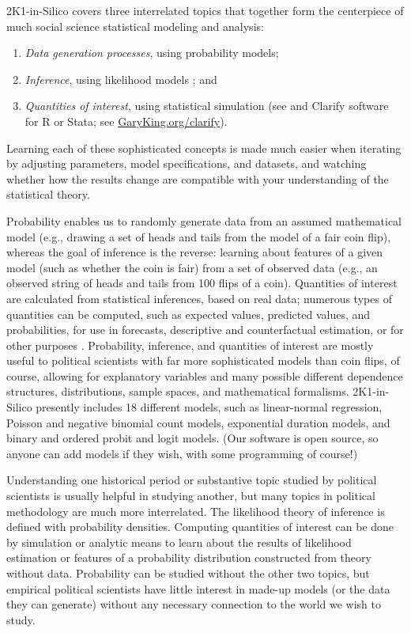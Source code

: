 \documentclass[12pt]{article}
\theoremstyle{definition}
\begin{document}
2K1-in-Silico covers three interrelated topics that together form the centerpiece of much social science statistical modeling and analysis:
\begin{enumerate}\singlespacing
  \item \emph{Data generation processes}, using probability models;
  \item \emph{Inference}, using likelihood models \citep{King98}; and
  \item \emph{Quantities of interest}, using statistical simulation (see \citealt{KinTomWit00} and Clarify software for R or Stata; see \href{https://GaryKing.org/clarify}{GaryKing.org/clarify}).
  \end{enumerate}
Learning each of these sophisticated concepts is made much easier when iterating by adjusting parameters, model specifications, and datasets, and watching whether how the results change are compatible with your understanding of the statistical theory.

Probability enables us to randomly generate data from an assumed mathematical model (e.g., drawing a set of heads and tails from the model of a fair coin flip), whereas the goal of inference is the reverse: learning about features of a given model (such as whether the coin is fair) from a set of observed data (e.g., an observed string of heads and tails from 100 flips of a coin). Quantities of interest are calculated from statistical inferences, based on real data; numerous types of quantities can be computed, such as expected values, predicted values, and probabilities, for use in forecasts, descriptive and counterfactual estimation, or for other purposes
.
Probability, inference, and quantities of interest are mostly useful to political scientists with far more sophisticated models than coin flips, of course, allowing for explanatory variables and many possible different dependence structures, distributions, sample spaces, and mathematical formalisms.  2K1-in-Silico presently includes 18 different models, such as linear-normal regression, Poisson and negative binomial count models, exponential duration models, and binary and ordered probit and logit models. (Our software is open source, so anyone can add models if they wish, with some programming of course!)

Understanding one historical period or substantive topic studied by political scientists is usually helpful in studying another, but many topics in political methodology are much more interrelated.  The likelihood theory of inference is defined with probability densities. Computing quantities of interest can be done by simulation or analytic means to learn about the results of likelihood estimation or features of a probability distribution constructed from theory without data. Probability can be studied without the other two topics, but empirical political scientists have little interest in made-up models (or the data they can generate) without any necessary connection to the world we wish to study.
\end{document}
